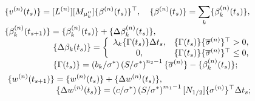 \begin{gather}
\label{eq:4:3:7}

\begin{array}{l}

\displaystyle \{v^{(n)}(t_{s})\}= [L^{(n)}] [M_{\mu''_k}]

\{\beta^{(n)}(t_s)\}^\top , \quad \{\beta^{(n)}(t_s)\}=\sum_k

\{\beta_k^{(n)}(t_s) \},

\\

\displaystyle

\{\beta_k^{(n)}(t_{s+1})\} =\{\beta_k^{(n)}(t_{s})\}+ \{\Delta \beta_k^{(n)}(t_{s})\},\\

\hspace{2cm}\{\Delta \beta_k(t_s)\}=

\left\{

\begin{array}{c l}

\lambda_k\{\Gamma(t_s)\} \Delta t_s,  &

\{\Gamma(t_s)\}\{\overline \sigma ^{(n)} \}^\top  >0,\\

0, &\{\Gamma(t_s)\}\{\overline \sigma ^{(n)} \}^\top  \leq 0,

\end{array}

\right.\\

\hspace{2cm}\displaystyle

\{\Gamma(t_s)\} = (b_k/ {\sigma^*}) \left({S}/{\sigma^*} \right)^{n_2-1} \{\overline \sigma ^{(n)} \}  -

\{\beta_k^{(n)}(t_s) \} ;

\end{array}

\\

\label{eq:4:3:8}

\begin{array}{l}

\displaystyle

\{w^{(n)}(t_{s+1})\}= \{w^{(n)}(t_{s})\}+\{\Delta w^{(n)}(t_{s})\},\\

\hspace{2cm}\displaystyle

\{\Delta w^{(n)}(t_s)\}= ({c}/{\sigma^*}) \left({S}/{\sigma^* }\right)^{m_1-1} [N_{1/2}]\{\sigma^{(n)} \}^\top  \Delta t_s;


\end{array}
\end{gather}
